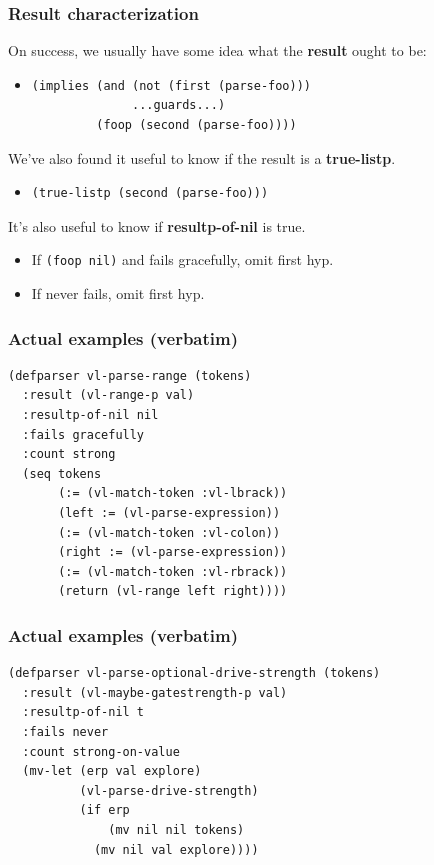 \documentclass{beamer}
\newcommand{\SmallSkip}{\vspace{0.5cm}\noindent}
\begin{document}
\begin{frame}[fragile]
\frametitle{Result characterization}

On success, we usually have some idea what the {\bf result} ought to be:
\begin{itemize}
\item {\small\begin{verbatim}
(implies (and (not (first (parse-foo)))
              ...guards...)
         (foop (second (parse-foo))))
\end{verbatim}}
\end{itemize}

\SmallSkip
We've also found it useful to know if the result is a {\bf true-listp}.
\begin{itemize}
\item {\small\begin{verbatim}
(true-listp (second (parse-foo)))
\end{verbatim}}
\end{itemize}

\SmallSkip It's also useful to know if {\bf resultp-of-nil} is true.
\begin{itemize}
\item If {\tt (foop nil)} and fails gracefully, omit first hyp.
\item If never fails, omit first hyp.
\end{itemize}

\end{frame}



\begin{frame}[fragile]
\frametitle{Actual examples (verbatim)}

{\small
\begin{verbatim}
(defparser vl-parse-range (tokens)
  :result (vl-range-p val)
  :resultp-of-nil nil
  :fails gracefully
  :count strong
  (seq tokens
       (:= (vl-match-token :vl-lbrack))
       (left := (vl-parse-expression))
       (:= (vl-match-token :vl-colon))
       (right := (vl-parse-expression))
       (:= (vl-match-token :vl-rbrack))
       (return (vl-range left right))))
\end{verbatim}}
\end{frame}

\begin{frame}[fragile]
\frametitle{Actual examples (verbatim)}

{\small
\begin{verbatim}
(defparser vl-parse-optional-drive-strength (tokens)
  :result (vl-maybe-gatestrength-p val)
  :resultp-of-nil t
  :fails never
  :count strong-on-value
  (mv-let (erp val explore)
          (vl-parse-drive-strength)
          (if erp
              (mv nil nil tokens)
            (mv nil val explore))))
\end{verbatim}}

\end{frame}
\end{document}
